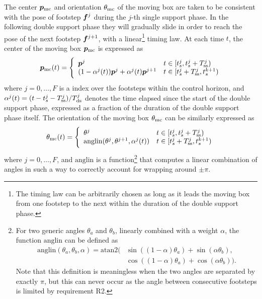 The center ${\bm{p}}_{\rm mc}$ and orientation $\theta_{\rm mc}$ of the moving box are taken to be consistent with the pose of footstep ${\bm{f}}^j$ during the $j$-th single support phase. In the following double support phase they will gradually slide in order to reach the pose of the next footstep ${\bm{f}}^{j+1}$, with a linear\footnote{The timing law can be arbitrarily chosen as long as it leads the moving box from one footstep to the next within the duration of the double support phase.} timing law. At each time $t$, the center of the moving box ${\bm{p}}_{\rm mc}$ is expressed as
\begin{equation}\label{eq: moving constraint}
{\bm{p}}_{\rm mc}(t) = \Bigg\{
\begin{array}{ll}
{\bm{p}}^j & t\in [t_s^j, t_s^j + T_{\rm ss}^j) \\
(1-\alpha^j(t)){\bm{p}}^j + \alpha^j(t){\bm{p}}^{j+1} & t\in [t_s^j + T_{\rm ss}^j, t_s^{k+1})
\end{array}
\end{equation}
where $j=0,\dots,F$ is a index over the footsteps within the control horizon, and $\alpha^j(t) = (t-t_s^j-T_{\rm ss}^j)/T_{\rm ds}^j$ denotes the time elapsed since the start of the double support phase, expressed as a fraction of the duration of the double support phase itself.
The orientation of the moving box $\theta_{\rm mc}$ can be similarly expressed as
\begin{equation}\label{eq: moving constraint angle}
\theta_{\rm mc}(t) = \Bigg\{
\begin{array}{ll}
\theta^j & t\in [t_s^j, t_s^j + T_{\rm ss}^j) \\
\mathrm{anglin}(\theta^j,\theta^{j+1},\alpha^j(t)) & t\in [t_s^j + T_{\rm ss}^j, t_s^{k+1})
\end{array}
\end{equation}
where $j=0,\dots,F$, and $\mathrm{anglin}$ is a function\footnote{For two generic angles
$\theta_a$ and $\theta_b$, linearly combined with a weight $\alpha$, the function $\mathrm{anglin}$ can be defined as
\begin{equation*}\begin{split}
\mathrm{anglin}(\theta_a, \theta_b, \alpha) = \mathrm{atan2}(&\sin((1-\alpha)\theta_a) + \sin(\alpha\theta_b), \\&\cos((1-\alpha)\theta_a) + \cos(\alpha\theta_b)).
\end{split}\end{equation*}
Note that this definition is meaningless when the two angles are separated by exactly $\pi$, but this can never occur as the angle between consecutive footsteps is limited by requirement R2. } that computes a linear combination of angles in such a way to correctly account for wrapping around $\pm\pi$.

